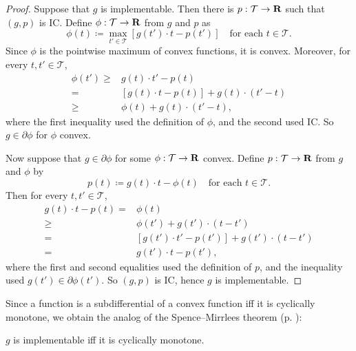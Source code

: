 \documentclass[11pt,letterpaper,reqno,oneside]{article}
\begin{document}
\begin{proof}
	Suppose that $g$ is implementable. Then there is $p : \mathcal{T} \to \mathbf{R}$ such that $(g,p)$ is IC. Define $\phi : \mathcal{T} \to \mathbf{R}$ from $g$ and $p$ as 
	\begin{equation*}
		\phi(t) \coloneqq \max_{t' \in \mathcal{T}} \left[ g(t') \cdot t - p(t') \right]
		\quad \text{for each $t \in \mathcal{T}$} .
	\end{equation*}
	Since $\phi$ is the pointwise maximum of convex functions, it is convex. Moreover, for every $t,t' \in \mathcal{T}$,
	\begin{align*}
		\phi(t')
		\geq{}& g(t) \cdot t' - p(t)
		\\
		={}& [ g(t) \cdot t - p(t) ] + g(t) \cdot (t'-t)
		\\
		\geq{}& \phi(t) + g(t) \cdot (t'-t) ,
	\end{align*}
	where the first inequality used the definition of $\phi$, and the second used IC. So $g \in \partial \phi$ for $\phi$ convex.

	Now suppose that $g \in \partial \phi$ for some $\phi : \mathcal{T} \to \mathbf{R}$ convex. Define $p : \mathcal{T} \to \mathbf{R}$ from $g$ and $\phi$ by
	\begin{equation*}
		p(t) \coloneqq g(t) \cdot t - \phi(t)
		\quad\text{for each $t \in \mathcal{T}$} .
	\end{equation*}
	Then for every $t,t' \in \mathcal{T}$,
	\begin{align*}
		g(t) \cdot t - p(t) 
		={}& \phi(t)
		\\
		\geq{}& \phi(t') + g(t') \cdot (t-t')
		\\
		={}& [ g(t') \cdot t' - p(t') ] + g(t') \cdot (t-t')
		\\
		={}& g(t') \cdot t - p(t') ,
	\end{align*}
	where the first and second equalities used the definition of $p$, and the inequality used $g(t') \in \partial \phi(t')$. So $(g,p)$ is IC, hence $g$ is implementable.
\end{proof}


Since a function is a subdifferential of a convex function iff it is cyclically monotone, we obtain the analog of the Spence--Mirrlees theorem (p. \pageref{theorem:implementable_monotone_1d}):
%
\begin{theorem}
	\label{theorem:implementable_monotone}
	$g$ is implementable iff it is cyclically monotone.
\end{theorem}
\end{document}
